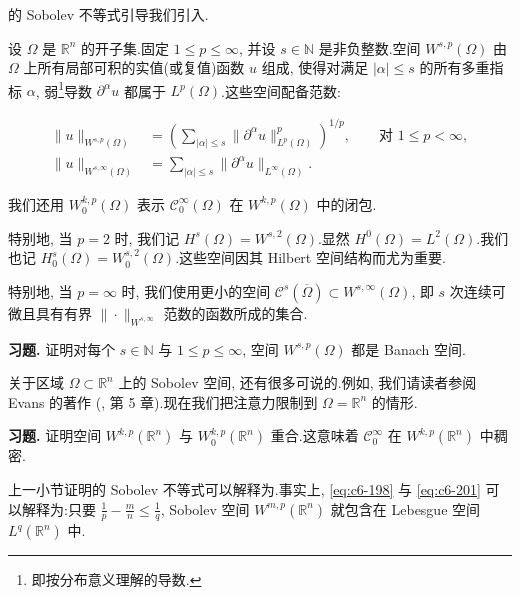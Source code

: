 
 的 Sobolev 不等式引导我们引入.

\begin{definition}\label{def:c6-2.13}
设 $\Omega$ 是 $\mathbb{R}^n$ 的开子集.固定 $1\le p\le\infty$, 并设 $s\in\mathbb{N}$ 是非负整数.空间 $W^{s, p}(\Omega)$ 由 $\Omega$ 上所有局部可积的实值(或复值)函数 $u$ 组成, 使得对满足 $|\alpha|\le s$ 的所有多重指标 $\alpha$, 弱\footnote{即按分布意义理解的导数.}导数 $\partial^\alpha u$ 都属于 $L^p(\Omega)$.这些空间配备范数:

\[
\begin{aligned}
\|u\|_{W^{s, p}(\Omega)} &= \left(\sum_{|\alpha|\le s}\|\partial^\alpha u\|_{L^p(\Omega)}^p\right)^{1/p}, \qquad \text{对 } 1\le p<\infty, \\
\|u\|_{W^{s, \infty}(\Omega)} &= \sum_{|\alpha|\le s}\|\partial^\alpha u\|_{L^\infty(\Omega)}.
\end{aligned}
\]
\end{definition}

我们还用 $W_0^{k, p}(\Omega)$ 表示 $\mathcal{C}_0^\infty(\Omega)$ 在 $W^{k, p}(\Omega)$ 中的闭包.

特别地, 当 $p=2$ 时, 我们记 $H^s(\Omega) = W^{s, 2}(\Omega)$.显然 $H^0(\Omega) = L^2(\Omega)$.我们也记 $H_0^s(\Omega) = W_0^{s, 2}(\Omega)$.这些空间因其 Hilbert 空间结构而尤为重要.

特别地, 当 $p=\infty$ 时, 我们使用更小的空间 $\mathcal{C}^s(\overline{\Omega})\subset W^{s, \infty}(\Omega)$, 即 $s$ 次连续可微且具有有界 $\|\cdot\|_{W^{s, \infty}}$ 范数的函数所成的集合.

\textbf{习题.} 证明对每个 $s\in\mathbb{N}$ 与 $1\le p\le\infty$, 空间 $W^{s, p}(\Omega)$ 都是 Banach 空间.

关于区域 $\Omega\subset\mathbb{R}^n$ 上的 Sobolev 空间, 还有很多可说的.例如, 我们请读者参阅 Evans 的著作 (\cite{e}, 第 5 章).现在我们把注意力限制到 $\Omega = \mathbb{R}^n$ 的情形.

\textbf{习题.} 证明空间 $W^{k, p}(\mathbb{R}^n)$ 与 $W_0^{k, p}(\mathbb{R}^n)$ 重合.这意味着 $\mathcal{C}_0^\infty$ 在 $W^{k, p}(\mathbb{R}^n)$ 中稠密.

上一小节证明的 Sobolev 不等式可以解释为.事实上, \eqref{eq:c6-198} 与 \eqref{eq:c6-201} 可以解释为:只要 $\frac{1}{p} - \frac{m}{n}\le\frac{1}{q}$, Sobolev 空间 $W^{m, p}(\mathbb{R}^n)$ 就包含在 Lebesgue 空间 $L^q(\mathbb{R}^n)$ 中.

